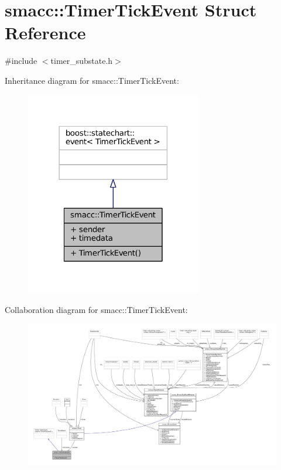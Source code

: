 \hypertarget{structsmacc_1_1TimerTickEvent}{}\section{smacc\+:\+:Timer\+Tick\+Event Struct Reference}
\label{structsmacc_1_1TimerTickEvent}


{\ttfamily \#include $<$timer\+\_\+substate.\+h$>$}



Inheritance diagram for smacc\+:\+:Timer\+Tick\+Event\+:
\nopagebreak
\begin{figure}[H]
\begin{center}
\leavevmode
\includegraphics[width=218pt]{structsmacc_1_1TimerTickEvent__inherit__graph}
\end{center}
\end{figure}


Collaboration diagram for smacc\+:\+:Timer\+Tick\+Event\+:
\nopagebreak
\begin{figure}[H]
\begin{center}
\leavevmode
\includegraphics[width=350pt]{structsmacc_1_1TimerTickEvent__coll__graph}
\end{center}
\end{figure}
